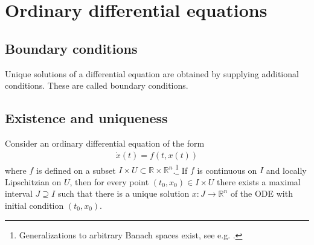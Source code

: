 \chapter{Ordinary differential equations}

\section{Boundary conditions}

    Unique solutions of a differential equation are obtained by supplying additional conditions. These are called boundary conditions.




\section{Existence and uniqueness}

    \begin{theorem}\label{diffeq:picard_lindelof}
        Consider an ordinary differential equation of the form
        \begin{gather}
            \dot{x}(t) = f(t, x(t))
        \end{gather}
        where $f$ is defined on a subset $I\times U\subset\mathbb{R}\times\mathbb{R}^n$.\footnote{Generalizations to arbitrary Banach spaces exist, see e.g. \cite{AMP1}.} If $f$ is continuous on $I$ and locally Lipschitzian on $U$, then for every point $(t_0, x_0)\in I\times U$ there exists a maximal interval $J\supseteq I$ such that there is a unique solution $x:J\rightarrow\mathbb{R}^n$ of the ODE with initial condition $(t_0, x_0)$.
    \end{theorem}

